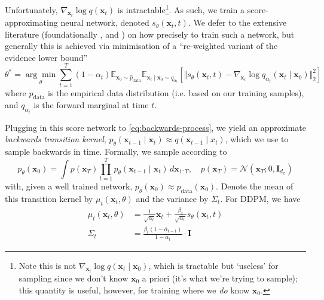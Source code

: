 Unfortunately, $\nabla_{\mathbf{x}_t}\log q(\mathbf{x}_t)$ is intractable\footnote{Note this is not
$\nabla_{\mathbf{x}_t}\log q(\mathbf{x}_t \mid \mathbf{x}_0)$, which is tractable but `useless'
for sampling since we don't know $\mathbf{x}_0$ a priori (it's what we're trying to sample); this
quantity is useful, however, for training where we \emph{do} know $\mathbf{x}_0$.}.
As such, we train a score-approximating \parencite{songScoreBasedGenerativeModeling2021} neural
network, denoted $s_\theta(\mathbf{x}_t, t)$. We defer to the extensive literature (foundationally
\textcite{hoDenoisingDiffusionProbabilistic2020}, \textcite{songScoreBasedGenerativeModeling2021}
and \textcite{nicholImprovedDenoisingDiffusion2021}) on how precisely to train such a network, but
generally this is achieved via minimisation of a ``re-weighted variant of the evidence lower bound''
\parencite{songScoreBasedGenerativeModeling2021}
\begin{equation*}
    \theta^* = \underset{\theta}{\arg\min}\sum_{t=1}^T (1 - \alpha_t)\mathbb{E}_{\mathbf{x}_0 \sim \hat{p}_{\text{data}}}\mathbb{E}_{\mathbf{x}_t \mid \mathbf{x}_0 \sim q_{\alpha_t}}\left[\Vert s_\theta(\mathbf{x}_t, t) - \nabla_{\mathbf{x}_t}\log q_{\alpha_t}(\mathbf{x}_t \mid \mathbf{x}_0)\Vert_2^2\right]
\end{equation*}
where $\hat{p}_{\text{data}}$ is the empirical data distribution (i.e. based on our training
samples), and $q_{\alpha_t}$ is the forward marginal at time $t$.

Plugging in this score network to \autoref{eq:backwards-process}, we yield an approximate
\emph{backwards transition kernel},
$p_\theta(\mathbf{x}_{t-1} \mid \mathbf{x}_t) \approx q(\mathbf{x}_{t-1} \mid x_t)$, which we use to
sample backwards in time. Formally, we sample according to
\begin{equation}
    p_\theta(\mathbf{x}_0) = \int p(\mathbf{x}_T)\prod_{t=1}^T p_\theta(\mathbf{x}_{t-1} \mid \mathbf{x}_{t})\, d\mathbf{x}_{1:T},\quad p(\mathbf{x}_T) = \mathcal{N}(\mathbf{x}_T; 0, \mathbf{I}_{d_x}) \label{eq:uncond-sampling}
\end{equation}
with, given a well trained network, $p_\theta(\mathbf{x}_0) \approx p_{\text{data}}(\mathbf{x}_0)$.
Denote the mean of this transition kernel by $\mu_t(\mathbf{x}_t, \theta)$ and the variance by
$\Sigma_t$. For DDPM, we have
\begin{align}
    \mu_t(\mathbf{x}_t, \theta) &= \frac{1}{\sqrt{\alpha_t}}\mathbf{x}_{t} + \frac{\beta_t}{\sqrt{\alpha_t}}s_\theta(\mathbf{x}_t, t) \label{eq:ddpm-mu} \\
    \Sigma_t &= \frac{\beta_t(1 - \overline{\alpha}_{t-1})}{1 - \overline{\alpha}_t}\cdot \mathbf{I} \label{eq:ddpm-sigma}
\end{align}

